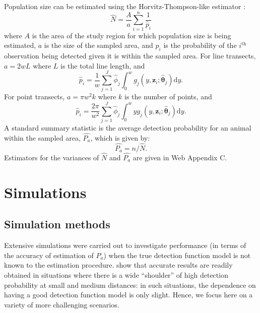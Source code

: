 \documentclass[authoryear,preprint,review,12pt]{elsarticle}
\begin{document}
Population size can be estimated using the Horvitz-Thompson-like estimator \citep{Marques:2003vb}:
\begin{equation}
\label{e:popsize}
\hat{N}=\frac{A}{a}\sum_{i=1}^n \frac{1}{\hat {p}_i}
\end{equation}
where $A$ is the area of the study region for which population size is being estimated, $a$ is the size of the sampled area, and $p_i$ is the probability of the $i^\text{th}$ observation being detected given it is within the sampled area.  For line transects, $a=2wL$ where $L$ is the total line length, and 
\begin{equation*}
\hat{p}_i = \frac{1}{w} \sum_{j=1}^J \hat{\phi}_j \int_0^w  g_j(y,\mathbf{z}_{i}; \bm{\hat{\theta}}_j) \text{d}y.
\end{equation*}
For point transects, $a=\pi w^2 k$ where $k$ is the number of points, and 
\begin{equation*}
\hat{p}_i = \frac{2\pi}{w^2} \sum_{j=1}^J \hat{\phi}_j \int_0^w  y g_j(y,\mathbf{z}_{i}; \bm{\hat{\theta}
}_j) \text{d}y.
\end{equation*}
A standard summary statistic is the average detection probability for an animal within the sampled area, $\hat{P_a}$, which is given by:
\begin{equation*}
\hat{P_a} = n/\hat{N}.
\end{equation*}
Estimators for the variances of $\hat{N}$ and $\hat{P_a}$ are given in Web Appendix C.

\section{Simulations}
\label{s:sims}

\subsection{Simulation methods}

Extensive simulations were carried out to investigate performance (in terms of the accuracy of estimation of $P_a$) when the true detection function model is not known to the estimation procedure. 
 \cite{Buckland:2001vm} show that accurate results are readily obtained in situations where there is a wide ``shoulder'' of high detection probability at small and medium distances: in such situations, the dependence on having a good detection function model is only slight.  Hence, we focus here on a variety of more challenging scenarios.
\end{document}
